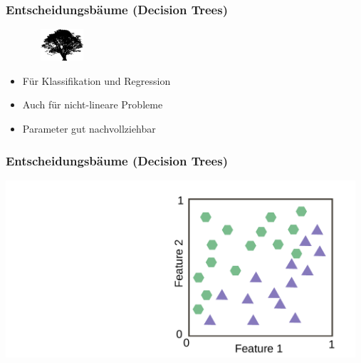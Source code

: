\documentclass[aspectratio=169]{beamer}
\begin{document}
\begin{frame}
  \frametitle{Entscheidungsbäume (Decision Trees)}
  \begin{block}{}
    \vspace{0.5cm}
    \begin{minipage}{0.2\textwidth}
      \ \ \ \ \ \ \
      \includegraphics[width=1.6cm]{images/publicdomainvectors_Chrisdesign_Tree_silhouettes_5.pdf}
    \end{minipage}
    \hfill
    \begin{minipage}{0.7\textwidth}
      \begin{itemize}
      \item Für Klassifikation und Regression
      \item Auch für nicht-lineare Probleme
      \item Parameter gut nachvollziehbar
      \end{itemize}
    \end{minipage}
    \vspace{0.5cm}
  \end{block}
\end{frame}

\begin{frame}
  \frametitle{Entscheidungsbäume (Decision Trees)}
  \begin{center}
    \includegraphics[width=13.0cm]{images/decision_tree_0.pdf}
  \end{center}  
\end{frame}
\end{document}
